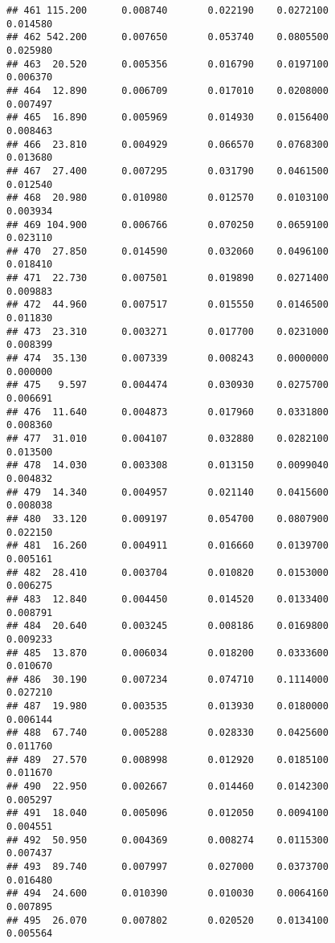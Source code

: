 \documentclass[
]{article}
\begin{document}
\begin{verbatim}
## 461 115.200      0.008740       0.022190    0.0272100          0.014580
## 462 542.200      0.007650       0.053740    0.0805500          0.025980
## 463  20.520      0.005356       0.016790    0.0197100          0.006370
## 464  12.890      0.006709       0.017010    0.0208000          0.007497
## 465  16.890      0.005969       0.014930    0.0156400          0.008463
## 466  23.810      0.004929       0.066570    0.0768300          0.013680
## 467  27.400      0.007295       0.031790    0.0461500          0.012540
## 468  20.980      0.010980       0.012570    0.0103100          0.003934
## 469 104.900      0.006766       0.070250    0.0659100          0.023110
## 470  27.850      0.014590       0.032060    0.0496100          0.018410
## 471  22.730      0.007501       0.019890    0.0271400          0.009883
## 472  44.960      0.007517       0.015550    0.0146500          0.011830
## 473  23.310      0.003271       0.017700    0.0231000          0.008399
## 474  35.130      0.007339       0.008243    0.0000000          0.000000
## 475   9.597      0.004474       0.030930    0.0275700          0.006691
## 476  11.640      0.004873       0.017960    0.0331800          0.008360
## 477  31.010      0.004107       0.032880    0.0282100          0.013500
## 478  14.030      0.003308       0.013150    0.0099040          0.004832
## 479  14.340      0.004957       0.021140    0.0415600          0.008038
## 480  33.120      0.009197       0.054700    0.0807900          0.022150
## 481  16.260      0.004911       0.016660    0.0139700          0.005161
## 482  28.410      0.003704       0.010820    0.0153000          0.006275
## 483  12.840      0.004450       0.014520    0.0133400          0.008791
## 484  20.640      0.003245       0.008186    0.0169800          0.009233
## 485  13.870      0.006034       0.018200    0.0333600          0.010670
## 486  30.190      0.007234       0.074710    0.1114000          0.027210
## 487  19.980      0.003535       0.013930    0.0180000          0.006144
## 488  67.740      0.005288       0.028330    0.0425600          0.011760
## 489  27.570      0.008998       0.012920    0.0185100          0.011670
## 490  22.950      0.002667       0.014460    0.0142300          0.005297
## 491  18.040      0.005096       0.012050    0.0094100          0.004551
## 492  50.950      0.004369       0.008274    0.0115300          0.007437
## 493  89.740      0.007997       0.027000    0.0373700          0.016480
## 494  24.600      0.010390       0.010030    0.0064160          0.007895
## 495  26.070      0.007802       0.020520    0.0134100          0.005564

\end{verbatim}
\end{document}
